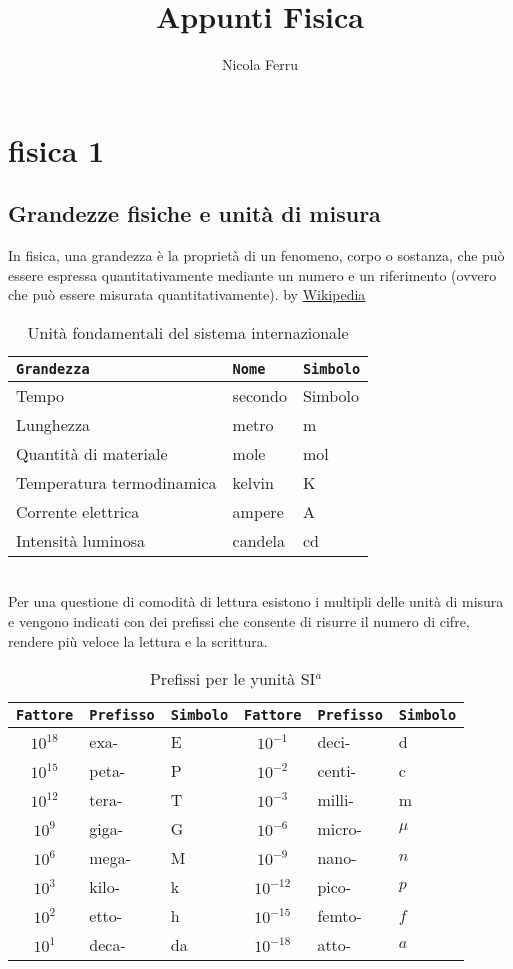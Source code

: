 \documentclass{book}
\title{Appunti Fisica}
\author{Nicola Ferru}
\date{}
\begin{document}
\maketitle
\tableofcontents
\listoftables
\listoffigures


\part{fisica 1}
\chapter{Grandezze fisiche e unità di misura}
In fisica, una grandezza è la proprietà di un fenomeno, corpo o sostanza, che può essere espressa quantitativamente mediante un numero e un riferimento (ovvero che può essere misurata quantitativamente). by \href{https://it.wikipedia.org/wiki/Grandezza_fisica}{Wikipedia}
\begin{table}[!h]
	\centering
	\begin{tabular}{lll}
		\texttt{Grandezza}&\texttt{Nome}&\texttt{Simbolo}\\\hline
		Tempo&secondo&Simbolo\\
		Lunghezza&metro&m\\
		Quantità di materiale&mole&mol\\
		Temperatura termodinamica&kelvin&K\\
		Corrente elettrica&ampere&A\\
		Intensità luminosa&candela&cd\\\hline
	\end{tabular}
\caption{Unità fondamentali del sistema internazionale}
\label{table:1}
\end{table}\\
Per una questione di comodità di lettura esistono i multipli delle unità di
misura e vengono indicati con dei prefissi che consente di risurre il numero di
cifre, rendere più veloce la lettura e la scrittura.
\begin{table}[!h]
	\centering
	\begin{tabular}{cll|cll}
		\texttt{Fattore}&\texttt{Prefisso}&\texttt{Simbolo}&\texttt{Fattore}&\texttt{Prefisso}&\texttt{Simbolo}\\\hline
		$10^{18}$&exa-&E&$10^{-1}$&deci-&d\\
		$10^{15}$&peta-&P&$10^{-2}$&centi-&c\\
		$10^{12}$&tera-&T&$10^{-3}$&milli-&m\\
		$10^{9}$&giga-&G&$10^{-6}$&micro-&$\mu$\\
		$10^{6}$&mega-&M&$10^{-9}$&nano-&$n$\\
		$10^{3}$&kilo-&k&$10^{-12}$&pico-&$p$\\
		$10^{2}$&etto-&h&$10^{-15}$&femto-&$f$\\
		$10^{1}$&deca-&da&$10^{-18}$&atto-&$a$\\\hline

	\end{tabular}
\caption{Prefissi per le yunità SI$^a$}
\end{table}
\end{document}
